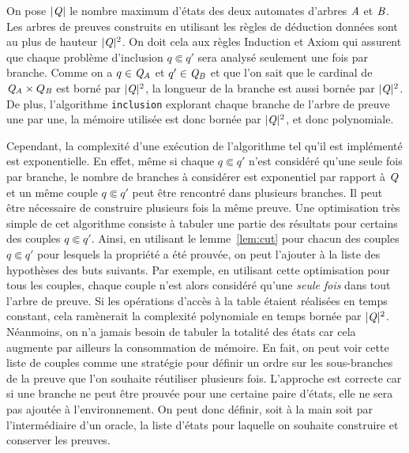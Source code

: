 On pose $|\mathit Q|$ le nombre maximum d'états des deux automates d'arbres $\mathit A$ et $\mathit B$.  Les arbres de preuves
construits en utilisant les règles de déduction données sont au plus de hauteur $|\mathit Q|^2$.
On doit cela aux règles Induction et Axiom qui assurent que chaque problème d'inclusion $q \Subset q'$
sera analysé seulement une fois par branche. 
Comme on a $q\in \mathit Q_\mathit A$ et $q' \in \mathit Q_\mathit B$ et que l'on sait que le cardinal de $\mathit Q_\mathit A \times Q_\mathit B$ est borné par $|\mathit Q|^2$,
la longueur de la branche est aussi bornée par $|\mathit Q|^2$.  De plus, l'algorithme \lstinline!inclusion! explorant chaque branche 
de l'arbre de preuve une par une, la mémoire utilisée est donc bornée par $|\mathit Q|^2$,
et donc polynomiale.

Cependant, la complexité d'une exécution de l'algorithme tel qu'il est implémenté est exponentielle.
En effet, même si chaque $q \Subset q'$ n'est considéré qu'une seule fois par branche,
le nombre de branches à considérer est exponentiel par rapport à 
$\mathit Q$ et un même couple $q \Subset q'$ peut être rencontré dans plusieurs branches.
Il peut être nécessaire de construire plusieurs fois la même preuve.
Une optimisation très simple de cet algorithme consiste à tabuler une partie des résultats
pour certains des couples $q \Subset q'$. Ainsi, en utilisant le lemme~\ref{lem:cut}
pour chacun des couples $q \Subset q'$ pour lesquels la propriété a été prouvée, on peut l'ajouter
à la liste des hypothèses des buts suivants. 
Par exemple, en utilisant cette optimisation pour tous les couples,
chaque couple n'est alors considéré qu'une {\em seule fois} dans tout l'arbre de preuve.
Si les opérations d'accès à la table étaient réalisées en temps constant, 
cela ramènerait la complexité polynomiale en temps bornée par $|\mathit Q|^2$. 
Néanmoins, on n'a jamais besoin de tabuler la totalité des états car cela augmente par ailleurs
la consommation de mémoire. En fait, on peut voir cette liste de couples comme une stratégie
pour définir un ordre sur les sous-branches de la preuve que l'on souhaite réutiliser plusieurs fois.
L'approche est correcte car si une branche ne peut être prouvée pour une certaine paire d'états, 
elle ne sera pas ajoutée à l'environnement. On peut donc définir, soit à la main soit par l'intermédiaire
d'un oracle, la liste d'états pour laquelle on souhaite construire et conserver les preuves.



